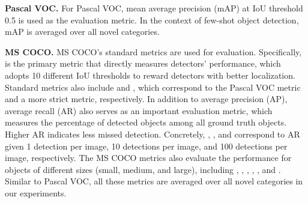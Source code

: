 \documentclass[10pt,twocolumn,letterpaper]{article}
\begin{document}
\smallskip
\noindent
\textbf{Pascal VOC.}
For Pascal VOC, mean average precision (mAP) at IoU threshold 0.5 is used as the evaluation metric. In the context of few-shot object detection, mAP is averaged over all novel categories.

\smallskip
\noindent
\textbf{MS COCO.}
MS COCO's standard metrics are used for evaluation. Specifically,  is the primary metric that directly measures detectors' performance, which adopts 10 different IoU thresholds to reward detectors with better localization. Standard metrics also include  and , which correspond to the Pascal VOC metric and a more strict metric, respectively. In addition to average precision (AP), average recall (AR) also serves as an important evaluation metric, which measures the percentage of detected objects among all ground truth objects. Higher AR indicates less missed detection. Concretely, , , and  correspond to AR given 1 detection per image, 10 detections per image, and 100 detections per image, respectively. The MS COCO metrics also evaluate the performance for objects of different sizes (small, medium, and large), including , , , , , and . Similar to Pascal VOC, all these metrics are averaged over all novel categories in our experiments.



\begin{table}
\begin{center}
\end{center}
\vspace*{-1.0mm}
\caption{Inference speed comparison. Results are obtained using NVIDIA GeForce RTX 2080Ti GPU with single batch size on Pascal VOC.}
\label{tab:appendix_inferencespeed}
\end{table} 
\end{document}
